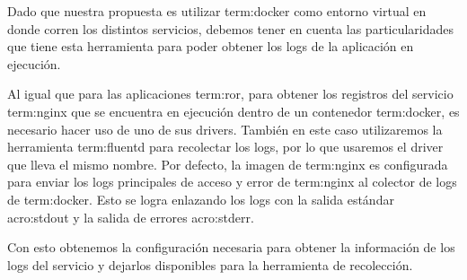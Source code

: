 Dado que nuestra propuesta es utilizar \gls{term:docker} como entorno virtual
en donde corren los distintos servicios, debemos tener en cuenta las
particularidades que tiene esta herramienta para poder obtener los logs de la
aplicación en ejecución.

Al igual que para las aplicaciones \gls{term:ror}, para obtener los registros
del servicio \gls{term:nginx} que se encuentra en ejecución dentro de un
contenedor \gls{term:docker}, es necesario hacer uso de uno de sus drivers.
También en este caso utilizaremos la herramienta \gls{term:fluentd} para
recolectar los logs, por lo que usaremos el driver que lleva el mismo nombre.
Por defecto, la imagen de \gls{term:nginx} es configurada para enviar los logs
principales de acceso y error de \gls{term:nginx} al colector de logs de
\gls{term:docker}. Esto se logra enlazando los logs con la salida estándar
\gls{acro:stdout} y la salida de errores \gls{acro:stderr}.

Con esto obtenemos la configuración necesaria para obtener la información de
los logs del servicio y dejarlos disponibles para la herramienta de
recolección.
